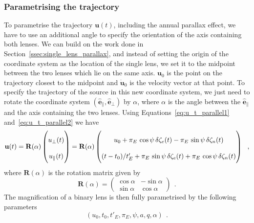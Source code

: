 \documentclass[12pt,dvipsnames]{report}
\newcommand{\hquad}{~~}
\begin{document}
\subsubsection{Parametrising the trajectory}
To parametrise the trajectory $\mathbf u(t)$, including the annual parallax effect,
we have to use an additional angle to specify the orientation of the axis
containing both lenses. We can build on the work done in
Section~\ref{ssec:single_lens_parallax}, and instead of setting the origin
of the coordinate system as the location of the single lens, we set it to
the midpoint between the two lenses which lie on the same axis. $\mathbf u_0$
is the point on the trajectory closest to the midpoint and $\dot{\mathbf
        u}_0$ is the velocity vector at that point. To specify the trajectory of the
source in this new coordinate system, we just need to rotate the coordinate
system $(\hat{\mathbf e}_\parallel, \hat{\mathbf e}_\bot)$ by $\alpha$,
where $\alpha$ is the angle between
the $\hat{\mathbf e}_\parallel$ and the axis containing the two lenses. Using
Equations~\ref{eq:u_t_parallel1} and~\ref{eq:u_t_parallel2} we have
\begin{equation}
    \mathbf u(t)  =
    \mathbf R(\alpha)
    \begin{pmatrix}
        u_\bot (t) \\
        u_\parallel (t)
    \end{pmatrix}
    =
    \mathbf R(\alpha)
    \renewcommand\arraystretch{2}
    \begin{pmatrix}
        u_0 + \pi_E\,\cos\psi\,\delta \zeta_e(t) - \pi_E\,\sin\psi\,\delta \zeta_n(t) \\
        (t-t_0)/t_E' + \pi_E\,\sin\psi\,\delta \zeta_e(t) +
        \pi_E\,\cos\psi\,\delta \zeta_n(t)
    \end{pmatrix}
    \hquad,
\end{equation}
where $\mathbf R (\alpha)$ is the rotation matrix  given by
\begin{equation}
    \mathbf R (\alpha)=
    \begin{pmatrix}
        \cos\alpha & -\sin\alpha \\
        \sin\alpha & \cos\alpha
    \end{pmatrix}
    \hquad.
\end{equation}
The magnification of a binary lens is then fully parametrised by the following parameters
\begin{equation}
    (u_0,t_0,t'_E,\pi_E,\psi, a, q, \alpha)
    \hquad.
\end{equation}
\end{document}
